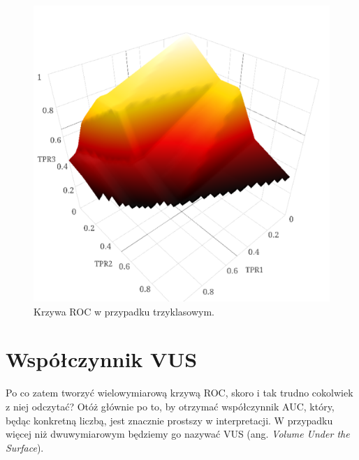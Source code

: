 \documentclass{mini}
\begin{document}
\begin{figure}[h]
\begin{center}
\includegraphics[scale=0.5]{graphics/roc3d.png}
\end{center}
\caption{Krzywa ROC w przypadku trzyklasowym.}
\label{3d}
\end{figure}

\section{Współczynnik VUS}

Po co zatem tworzyć wielowymiarową krzywą ROC, skoro i tak trudno cokolwiek z niej odczytać? Otóż głównie po to, by otrzymać współczynnik AUC, który, będąc konkretną liczbą, jest znacznie prostszy w interpretacji. W przypadku więcej niż dwuwymiarowym będziemy go nazywać VUS (ang. \textit{Volume Under the Surface}). 
\end{document}
